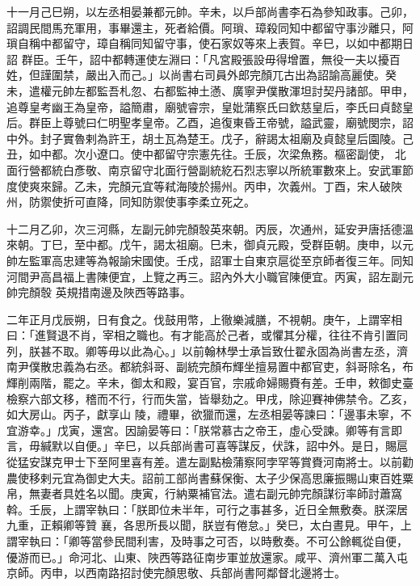 \begin{pinyinscope}
 十一月己巳朔，以左丞相晏兼都元帥。辛未，以戶部尚書李石為參知政事。己卯，詔調民間馬充軍用，事畢還主，死者給價。阿瑣、璋殺同知中都留守事沙離只，阿瑣自稱中都留守，璋自稱同知留守事，使石家奴等來上表賀。辛巳，以如中都期日詔
 群臣。壬午，詔中都轉運使左淵曰：「凡宮殿張設毋得增置，無役一夫以擾百姓，但謹圍禁，嚴出入而己。」以尚書右司員外郎完顏兀古出為詔諭高麗使。癸未，遣權元帥左都監吾札忽、右都監神土懣、廣寧尹僕散渾坦討契丹諸部。甲申，追尊皇考幽王為皇帝，謚簡肅，廟號睿宗，皇妣蒲察氏曰欽慈皇后，李氏曰貞懿皇后。群臣上尊號曰仁明聖孝皇帝。乙酉，追復東昏王帝號，謚武靈，廟號閔宗，詔中外。封子實魯剌為許王，胡土瓦為楚王。戊子，辭謁太祖廟及貞懿皇后園陵。己丑，如中都。次小遼口。使中都留守宗憲先往。壬辰，次梁魚務。樞密副使，
 北面行營都統白彥敬、南京留守北面行營副統紇石烈志寧以所統軍數來上。安武軍節度使爽來歸。乙未，完顏元宜等弒海陵於揚州。丙申，次義州。丁酉，宋人破陜州，防禦使折可直降，同知防禦使事李柔立死之。



 十二月乙卯，次三河縣，左副元帥完顏彀英來朝。丙辰，次通州，延安尹唐括德溫來朝。丁巳，至中都。戊午，謁太祖廟。巳未，御貞元殿，受群臣朝。庚申，以元帥左監軍高忠建等為報諭宋國使。壬戍，詔軍士自東京扈從至京師者復三年。同知河間尹高昌福上書陳便宜，上覽之再三。詔內外大小職官陳便宜。丙寅，詔左副元帥完顏彀
 英規措南邊及陜西等路事。



 二年正月戊辰朔，日有食之。伐鼓用幣，上徹樂減膳，不視朝。庚午，上謂宰相曰：「進賢退不肖，宰相之職也。有才能高於己者，或懼其分權，往往不肯引置同列，朕甚不取。卿等毋以此為心。」以前翰林學士承旨致仕翟永固為尚書左丞，濟南尹僕散忠義為右丞。都統斜哥、副統完顏布輝坐擅易置中都官吏，斜哥除名，布輝削兩階，罷之。辛未，御太和殿，宴百官，宗戚命婦賜賚有差。壬申，敕御史臺檢察六部文移，稽而不行，行而失當，皆舉劾之。甲戌，除迎賽神佛禁令。乙亥，如大房山。丙子，獻享山
 陵，禮畢，欲獵而還，左丞相晏等諫曰：「邊事未寧，不宜游幸。」戊寅，還宮。因諭晏等曰：「朕常慕古之帝王，虛心受諫。卿等有言即言，毋緘默以自便。」辛巳，以兵部尚書可喜等謀反，伏誅，詔中外。是日，賜扈從猛安謀克甲士下至阿里喜有差。遣左副點檢蒲察阿孛罕等賞賚河南將士。以前勸農使移剌元宜為御史大夫。詔前工部尚書蘇保衡、太子少保高思廉振賜山東百姓粟帛，無妻者具姓名以聞。庚寅，行納粟補官法。遣右副元帥完顏謀衍率師討蕭窩斡。壬辰，上謂宰執曰：「朕即位未半年，可行之事甚多，近日全無敷奏。朕深居九重，正賴卿等贊
 襄，各思所長以聞，朕豈有倦怠。」癸巳，太白晝見。甲午，上謂宰執曰：「卿等當參民間利害，及時事之可否，以時敷奏。不可公餘輒從自便，優游而已。」命河北、山東、陜西等路征南步軍並放還家。咸平、濟州軍二萬入屯京師。丙申，以西南路招討使完顏思敬、兵部尚書阿鄰督北邊將士。




\end{pinyinscope}
